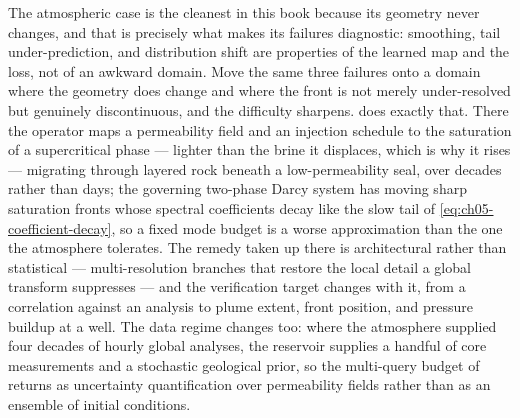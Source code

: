 The atmospheric case is the cleanest in this book because its geometry never changes, and
that is precisely what makes its failures diagnostic: smoothing, tail under-prediction, and
distribution shift are properties of the learned map and the loss, not of an awkward
domain. Move the same three failures onto a domain where the geometry does change and where
the front is not merely under-resolved but genuinely discontinuous, and the difficulty
sharpens.  does exactly that.
There the operator maps a permeability field and an injection schedule to the saturation of
a supercritical phase --- lighter than the brine it displaces, which is why it rises ---
migrating through layered rock beneath a low-permeability seal,
over decades rather than days; the governing two-phase Darcy system has moving sharp
saturation fronts whose spectral coefficients decay like the slow tail of
\eqref{eq:ch05-coefficient-decay}, so a fixed mode budget is a worse approximation than the
one the atmosphere tolerates. The remedy taken up there is architectural rather than
statistical --- multi-resolution branches that restore the local detail a global transform
suppresses --- and the verification target changes with it, from a correlation against an
analysis to plume extent, front position, and pressure buildup at a well. The data regime
changes too: where the atmosphere supplied four decades of hourly global analyses, the
reservoir supplies a handful of core measurements and a stochastic geological prior, so the
multi-query budget of  returns
as uncertainty quantification over permeability fields rather than as an ensemble of initial
conditions.

